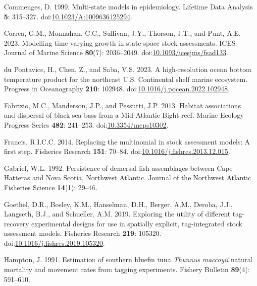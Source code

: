 \begin{CSLReferences}{1}{0}
\leavevmode{}%
Commenges, D. 1999. Multi-state models in epidemiology. Lifetime Data Analysis \textbf{5}: 315--327. doi:\href{https://doi.org/10.1023/A:1009636125294}{10.1023/A:1009636125294}.

\leavevmode{}%
Correa, G.M., Monnahan, C.C., Sullivan, J.Y., Thorson, J.T., and Punt, A.E. 2023. Modelling time-varying growth in state-space stock assessments. ICES Journal of Marine Science \textbf{80}(7): 2036--2049. doi:\href{https://doi.org/10.1093/icesjms/fsad133}{10.1093/icesjms/fsad133}.

\leavevmode{}%
du Pontavice, H., Chen, Z., and Saba, V.S. 2023. A high-resolution ocean bottom temperature product for the northeast {U}.{S}. Continental shelf marine ecosystem. Progress in Oceanography \textbf{210}: 102948. doi:\href{https://doi.org/10.1016/j.pocean.2022.102948}{10.1016/j.pocean.2022.102948}.

\leavevmode{}%
Fabrizio, M.C., Manderson, J.P., and Pessutti, J.P. 2013. Habitat associations and dispersal of black sea bass from a {M}id-{A}tlantic {B}ight reef. Marine Ecology Progress Series \textbf{482}: 241--253. doi:\href{https://doi.org/10.3354/meps10302}{10.3354/meps10302}.

\leavevmode{}%
Francis, R.I.C.C. 2014. Replacing the multinomial in stock assessment models: A first step. Fisheries Research \textbf{151}: 70--84. doi:\href{https://doi.org/10.1016/j.fishres.2013.12.015}{10.1016/j.fishres.2013.12.015}.

\leavevmode{}%
Gabriel, W.L. 1992. Persistence of demersal fish assemblages between {C}ape {H}atteras and {N}ova {S}cotia, {N}orthwest {A}tlantic. Journal of the Northwest Atlantic Fisheries Science \textbf{14}(1): 29--46.

\leavevmode{}%
Goethel, D.R., Bosley, K.M., Hanselman, D.H., Berger, A.M., Deroba, J.J., Langseth, B.J., and Schueller, A.M. 2019. Exploring the utility of different tag-recovery experimental designs for use in spatially explicit, tag-integrated stock assessment models. Fisheries Research \textbf{219}: 105320. doi:\href{https://doi.org/10.1016/j.fishres.2019.105320}{10.1016/j.fishres.2019.105320}.

\leavevmode{}%
Hampton, J. 1991. Estimation of southern bluefin tuna \emph{{T}hunnus maccoyii} natural mortality and movement rates from tagging experiments. Fishery Bulletin \textbf{89}(4): 591--610.


\end{CSLReferences}
